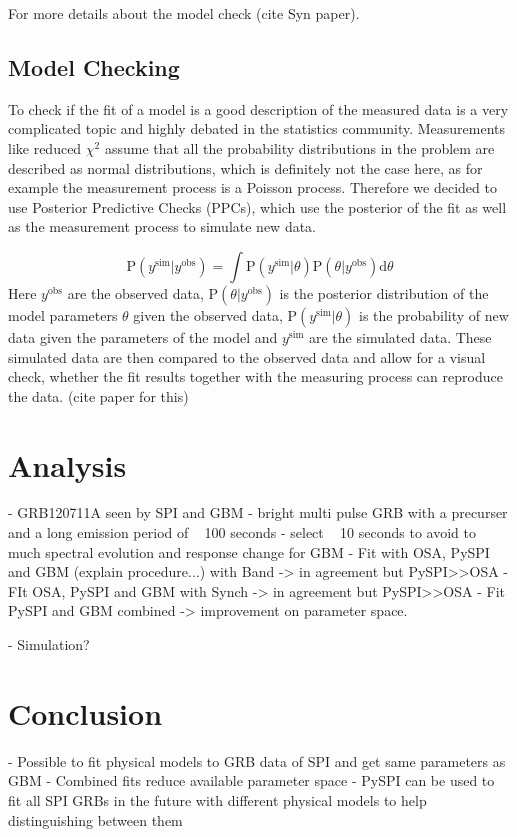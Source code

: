 \documentclass[modern]{aastex631}
\begin{document}
For more details about the model check (cite Syn paper).

\subsection{Model Checking}

To check if the fit of a model is a good description of the measured data is a very complicated topic and highly debated in the statistics community. Measurements like reduced $\chi^{2}$ assume that all the probability distributions in the problem are described as normal distributions, which is definitely not the case here, as for example the measurement process is a Poisson process. Therefore we decided to use Posterior Predictive Checks (PPCs), which use the posterior of the fit as well as the measurement process to simulate new data.

\begin{equation}
  \textrm{P}(y^{\textrm{sim}}|y^{\textrm{obs}}) = \int \textrm{P}(y^{\textrm{sim}}|\theta) \textrm{P}(\theta|y^{\textrm{obs}}) \mathrm{d}\theta
\end{equation}
\noindent
Here $y^{\textrm{obs}}$ are the observed data, $\textrm{P}(\theta|y^{\textrm{obs}})$ is the posterior distribution of the model parameters $\theta$ given the observed data, $\textrm{P}(y^{\textrm{sim}}|\theta)$ is the probability of new data given the parameters of the model and $y^{\textrm{sim}}$ are the simulated data. These simulated data are then compared to the observed data and allow for a visual check, whether the fit results together with the measuring process can reproduce the data. (cite paper for this)
\section{Analysis}

- GRB120711A seen by SPI and GBM
- bright multi pulse GRB with a precurser and a long emission period of ~ 100 seconds
- select ~ 10 seconds to avoid to much spectral evolution and response change for GBM
- Fit with OSA, PySPI and GBM (explain procedure...) with Band -> in agreement but PySPI>>OSA
- FIt OSA, PySPI and GBM with Synch -> in agreement but PySPI>>OSA
- Fit PySPI and GBM combined -> improvement on parameter space.

- Simulation?

\section{Conclusion}

- Possible to fit physical models to GRB data of SPI and get same parameters as GBM
- Combined fits reduce available parameter space
- PySPI can be used to fit all SPI GRBs in the future with different physical models to help distinguishing between them
\end{document}
